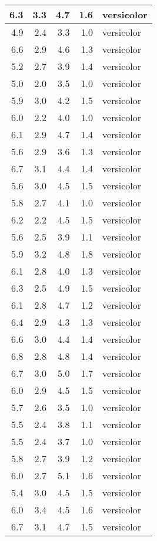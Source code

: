 \documentclass[]{article}
\begin{document}
\begin{tabular}{r|r|r|r|l}
\hline
6.3 & 3.3 & 4.7 & 1.6 & versicolor\\
\hline
4.9 & 2.4 & 3.3 & 1.0 & versicolor\\
\hline
6.6 & 2.9 & 4.6 & 1.3 & versicolor\\
\hline
5.2 & 2.7 & 3.9 & 1.4 & versicolor\\
\hline
5.0 & 2.0 & 3.5 & 1.0 & versicolor\\
\hline
5.9 & 3.0 & 4.2 & 1.5 & versicolor\\
\hline
6.0 & 2.2 & 4.0 & 1.0 & versicolor\\
\hline
6.1 & 2.9 & 4.7 & 1.4 & versicolor\\
\hline
5.6 & 2.9 & 3.6 & 1.3 & versicolor\\
\hline
6.7 & 3.1 & 4.4 & 1.4 & versicolor\\
\hline
5.6 & 3.0 & 4.5 & 1.5 & versicolor\\
\hline
5.8 & 2.7 & 4.1 & 1.0 & versicolor\\
\hline
6.2 & 2.2 & 4.5 & 1.5 & versicolor\\
\hline
5.6 & 2.5 & 3.9 & 1.1 & versicolor\\
\hline
5.9 & 3.2 & 4.8 & 1.8 & versicolor\\
\hline
6.1 & 2.8 & 4.0 & 1.3 & versicolor\\
\hline
6.3 & 2.5 & 4.9 & 1.5 & versicolor\\
\hline
6.1 & 2.8 & 4.7 & 1.2 & versicolor\\
\hline
6.4 & 2.9 & 4.3 & 1.3 & versicolor\\
\hline
6.6 & 3.0 & 4.4 & 1.4 & versicolor\\
\hline
6.8 & 2.8 & 4.8 & 1.4 & versicolor\\
\hline
6.7 & 3.0 & 5.0 & 1.7 & versicolor\\
\hline
6.0 & 2.9 & 4.5 & 1.5 & versicolor\\
\hline
5.7 & 2.6 & 3.5 & 1.0 & versicolor\\
\hline
5.5 & 2.4 & 3.8 & 1.1 & versicolor\\
\hline
5.5 & 2.4 & 3.7 & 1.0 & versicolor\\
\hline
5.8 & 2.7 & 3.9 & 1.2 & versicolor\\
\hline
6.0 & 2.7 & 5.1 & 1.6 & versicolor\\
\hline
5.4 & 3.0 & 4.5 & 1.5 & versicolor\\
\hline
6.0 & 3.4 & 4.5 & 1.6 & versicolor\\
\hline
6.7 & 3.1 & 4.7 & 1.5 & versicolor\\

\end{tabular}
\end{document}
